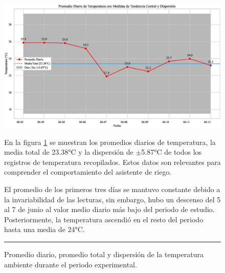 \documentclass[pdflatex,sn-mathphys-num]{sn-jnl}%
\theoremstyle{thmstyleone}%
\theoremstyle{thmstyletwo}%
\theoremstyle{thmstylethree}%
\begin{document}
\begin{figure}[H]
    \centering
    \includegraphics[width=1\textwidth]{assets/temperatura_promedio_y_estadisticas.eps}
    \caption{Promedio diario, promedio total y dispersión de la temperatura ambiente durante el periodo experimental.}
    \label{fig:temperatura_desviacion}

    \vspace{0.4cm}

    \noindent
    \begin{minipage}[t]{0.45\textwidth}
        \justifying
        En la figura \ref{fig:temperatura_desviacion} se muestran los promedios diarios de temperatura, la media total de 23.38°C y la dispersión de $\pm$5.87°C de todos los registros de temperatura recopilados. Estos datos son relevantes para comprender el comportamiento del asistente de riego.
	\end{minipage}%
    \hfill
    \begin{minipage}[t]{0.45\textwidth}
        \justifying
        El promedio de los primeros tres días se mantuvo constante debido a la invariabilidad de las lecturas, sin embargo, hubo un descenso del 5 al 7 de junio al valor medio diario más bajo del periodo de estudio. Posteriormente, la temperatura ascendió en el resto del periodo hasta una media de 24°C.

\end{minipage}

    \vspace{0.5cm}
    \hrule
\end{figure}
\end{document}

